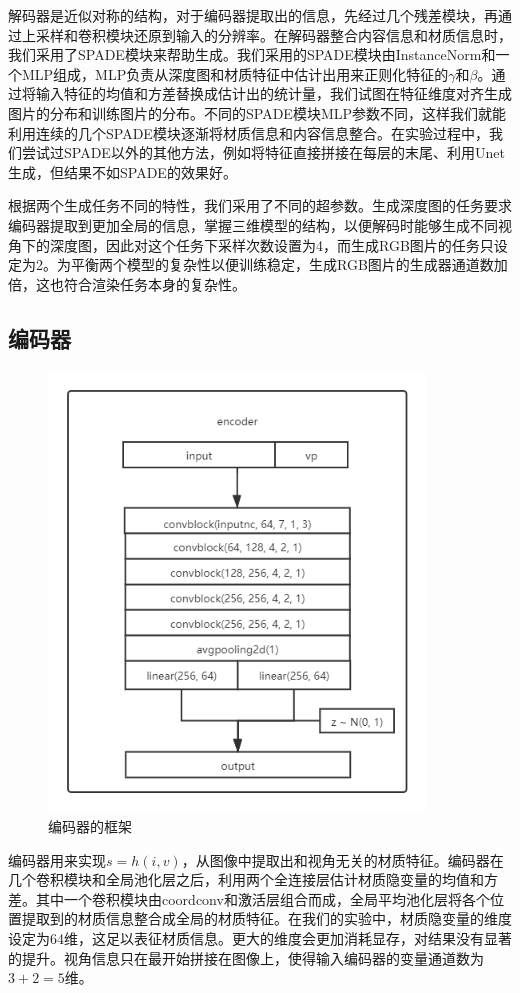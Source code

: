 \documentclass[UTF8,openany,AutoFakeBold,AutoFakeSlant,cs4size]{ctexbook}
\begin{document}
解码器是近似对称的结构，对于编码器提取出的信息，先经过几个残差模块，再通过上采样和卷积模块还原到输入的分辨率。在解码器整合内容信息和材质信息时，我们采用了SPADE模块来帮助生成。我们采用的SPADE模块由InstanceNorm和一个MLP组成，MLP负责从深度图和材质特征中估计出用来正则化特征的$\gamma$和$\beta$。通过将输入特征的均值和方差替换成估计出的统计量，我们试图在特征维度对齐生成图片的分布和训练图片的分布。不同的SPADE模块MLP参数不同，这样我们就能利用连续的几个SPADE模块逐渐将材质信息和内容信息整合。在实验过程中，我们尝试过SPADE以外的其他方法，例如将特征直接拼接在每层的末尾、利用Unet生成，但结果不如SPADE的效果好。

根据两个生成任务不同的特性，我们采用了不同的超参数。生成深度图的任务要求编码器提取到更加全局的信息，掌握三维模型的结构，以便解码时能够生成不同视角下的深度图，因此对这个任务下采样次数设置为4，而生成RGB图片的任务只设定为2。为平衡两个模型的复杂性以便训练稳定，生成RGB图片的生成器通道数加倍，这也符合渲染任务本身的复杂性。


\subsection{编码器}

\begin{figure}
\centering
\includegraphics[width=10cm]{./images/encoder.png}
\caption{编码器的框架}
\label{fig:sample}
\end{figure}

编码器用来实现$s = h(i, v)$，从图像中提取出和视角无关的材质特征。编码器在几个卷积模块和全局池化层之后，利用两个全连接层估计材质隐变量的均值和方差。其中一个卷积模块由coordconv和激活层组合而成，全局平均池化层将各个位置提取到的材质信息整合成全局的材质特征。在我们的实验中，材质隐变量的维度设定为64维，这足以表征材质信息。更大的维度会更加消耗显存，对结果没有显著的提升。视角信息只在最开始拼接在图像上，使得输入编码器的变量通道数为$3 + 2 = 5$维。
\end{document}

